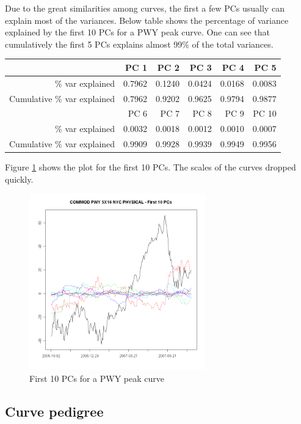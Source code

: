 \documentclass[12pt]{article}
\begin{document}
Due to the great similarities among curves, the first 
a few PCs usually can explain most of the variances. 
Below table shows the percentage of variance explained
by the first 10 PCs for a PWY peak curve. 
One can see that cumulatively the first 5 PCs explains
almost 99\% of the total variances. 
\begin{table}[ht]
\begin{center}
\begin{tabular}{rrrrrr}
  \hline
 & PC 1 & PC 2 & PC 3 & PC 4 & PC 5 \\
  \hline
\% var explained & 0.7962 & 0.1240 & 0.0424 & 0.0168 & 0.0083 \\
Cumulative \% var explained & 0.7962 & 0.9202 & 0.9625 & 0.9794 & 0.9877 \\
\hline \hline
 & PC 6 & PC 7 & PC 8 & PC 9 & PC 10 \\
\hline
\% var explained & 0.0032 & 0.0018 & 0.0012 & 0.0010 & 0.0007 \\
 Cumulative \% var explained & 0.9909 & 0.9928 & 0.9939 & 0.9949 & 0.9956 \\
   \hline
\end{tabular}
\end{center}
\end{table}

Figure \ref{pc-pwy} shows the plot for the first 10 PCs.
The scales of the curves dropped quickly.
\begin{figure}[htbp]
\centering
\includegraphics[width=3in, height=3in]{figures/pc-pwy-peak.png}
\caption{First 10 PCs for a PWY peak curve}
\label{pc-pwy}
\end{figure}

\subsection{Curve pedigree}
\end{document}
